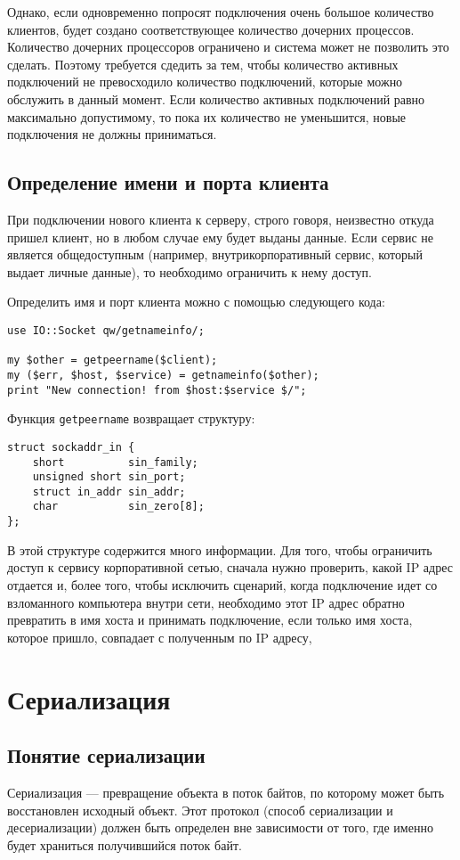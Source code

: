 Однако, если одновременно попросят подключения очень большое количество клиентов, будет создано соответствующее количество дочерних процессов. Количество дочерних процессоров ограничено и система может не позволить это сделать. Поэтому требуется сдедить за тем, чтобы количество активных подключений не превосходило количество подключений, которые можно обслужить в данный момент. Если количество активных подключений равно максимально допустимому, то пока их количество не уменьшится, новые подключения не должны приниматься.


\subsection{Определение имени и порта клиента}
При подключении нового клиента к серверу, строго говоря, неизвестно откуда пришел клиент, но в любом случае ему будет выданы данные. Если сервис не является общедоступным (например, внутрикорпоративный сервис, который выдает личные данные), то необходимо ограничить к нему доступ.

Определить имя и порт клиента можно с помощью следующего кода:
\begin{verbatim}
use IO::Socket qw/getnameinfo/;

my $other = getpeername($client);
my ($err, $host, $service) = getnameinfo($other);
print "New connection! from $host:$service $/";
\end{verbatim}
Функция \verb|getpeername| возвращает структуру:
\begin{verbatim}
struct sockaddr_in {
    short          sin_family;
    unsigned short sin_port;
    struct in_addr sin_addr;
    char           sin_zero[8];
};
\end{verbatim}
В этой структуре содержится много информации. Для того, чтобы ограничить доступ к сервису корпоративной сетью, сначала нужно проверить, какой IP адрес отдается и, более того, чтобы исключить сценарий, когда подключение идет со взломанного компьютера внутри сети, необходимо этот IP адрес обратно превратить в имя хоста и принимать подключение, если только имя хоста, которое пришло, совпадает с полученным по IP адресу,

\section{Сериализация} %
\subsection{Понятие сериализации} %
Сериализация --- превращение объекта в поток байтов, по которому может быть восстановлен исходный объект. Этот протокол (способ сериализации и десериализации) должен быть определен вне зависимости от того, где именно будет храниться получившийся поток байт.

